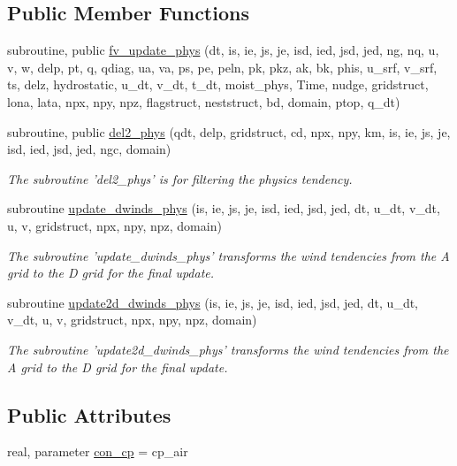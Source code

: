 \subsection*{Public Member Functions}
\begin{DoxyCompactItemize}
\item 
subroutine, public \hyperlink{classfv__update__phys__mod_a07d63d9929b6cb44156f6ceb8bc27728}{fv\-\_\-update\-\_\-phys} (dt, is, ie, js, je, isd, ied, jsd, jed, ng, nq, u, v, w, delp, pt, q, qdiag, ua, va, ps, pe, peln, pk, pkz, ak, bk, phis, u\-\_\-srf, v\-\_\-srf, ts, delz, hydrostatic, u\-\_\-dt, v\-\_\-dt, t\-\_\-dt, moist\-\_\-phys, Time, nudge, gridstruct, lona, lata, npx, npy, npz, flagstruct, neststruct, bd, domain, ptop, q\-\_\-dt)
\item 
subroutine, public \hyperlink{classfv__update__phys__mod_ac22298c1b84f158dcac8e2a11f3f5a4e}{del2\-\_\-phys} (qdt, delp, gridstruct, cd, npx, npy, km, is, ie, js, je, isd, ied, jsd, jed, ngc, domain)
\begin{DoxyCompactList}\small\item\em The subroutine 'del2\-\_\-phys' is for filtering the physics tendency. \end{DoxyCompactList}\item 
subroutine \hyperlink{classfv__update__phys__mod_a1b24aecbbffae6719af60e3eaf528c00}{update\-\_\-dwinds\-\_\-phys} (is, ie, js, je, isd, ied, jsd, jed, dt, u\-\_\-dt, v\-\_\-dt, u, v, gridstruct, npx, npy, npz, domain)
\begin{DoxyCompactList}\small\item\em The subroutine 'update\-\_\-dwinds\-\_\-phys' transforms the wind tendencies from the A grid to the D grid for the final update. \end{DoxyCompactList}\item 
subroutine \hyperlink{classfv__update__phys__mod_a7a3e9cb39f851c63333426b1fca48130}{update2d\-\_\-dwinds\-\_\-phys} (is, ie, js, je, isd, ied, jsd, jed, dt, u\-\_\-dt, v\-\_\-dt, u, v, gridstruct, npx, npy, npz, domain)
\begin{DoxyCompactList}\small\item\em The subroutine 'update2d\-\_\-dwinds\-\_\-phys' transforms the wind tendencies from the A grid to the D grid for the final update. \end{DoxyCompactList}\end{DoxyCompactItemize}
\subsection*{Public Attributes}
\begin{DoxyCompactItemize}
\item 
real, parameter \hyperlink{classfv__update__phys__mod_ab0a01adc2965f340c0a3706adeb96bde}{con\-\_\-cp} = cp\-\_\-air
\end{DoxyCompactItemize}


